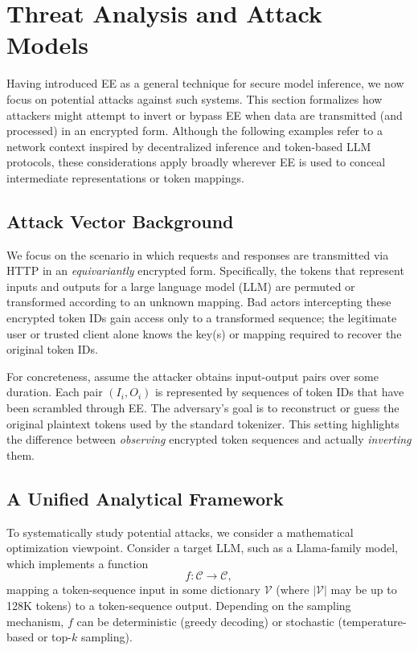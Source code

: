 \documentclass[10pt]{article}
\begin{document}
\section{Threat Analysis and Attack Models}
\label{sec:attack_models}

Having introduced EE as a general technique for secure model inference, we now focus on potential attacks against such systems. 
This section formalizes how attackers might attempt to invert or bypass EE when data are transmitted (and processed) in an encrypted form. Although the following examples refer to a network context inspired by decentralized inference and token-based LLM protocols, these considerations apply broadly wherever EE is used to conceal intermediate representations or token mappings.

\subsection{Attack Vector Background}
\label{subsec:attack_vector}

We focus on the scenario in which requests and responses are transmitted via HTTP in an \emph{equivariantly} encrypted form. Specifically, the tokens that represent inputs and outputs for a large language model (LLM) are permuted or transformed according to an unknown mapping. Bad actors intercepting these encrypted token IDs gain access only to a transformed sequence; the legitimate user or trusted client alone knows the key(s) or mapping required to recover the original token IDs. 

For concreteness, assume the attacker obtains input-output pairs over some duration. Each pair $(I_i, O_i)$ is represented by sequences of token IDs that have been scrambled through EE. The adversary’s goal is to reconstruct or guess the original plaintext tokens used by the standard tokenizer. This setting highlights the difference between \emph{observing} encrypted token sequences and actually \emph{inverting} them. 

\subsection{A Unified Analytical Framework}
\label{subsec:attack_framework}

To systematically study potential attacks, we consider a mathematical optimization viewpoint. Consider a target LLM, such as a Llama-family model, which implements a function 
\[
f: \mathcal{C} \to \mathcal{C},
\] 
mapping a token-sequence input in some dictionary $\mathcal{V}$ (where $|\mathcal{V}|$ may be up to 128K tokens) to a token-sequence output. Depending on the sampling mechanism, $f$ can be deterministic (greedy decoding) or stochastic (temperature-based or top-$k$ sampling).
\end{document}
